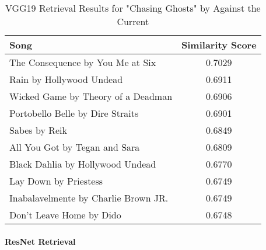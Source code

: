 \documentclass[sigconf]{acmart}
\begin{document}
\begin{table}[ht]
    \centering
    \caption{VGG19 Retrieval Results for "Chasing Ghosts" by Against the Current}
    \label{tab:vgg19_chasing_ghosts}
    \begin{tabular}{lc}
        \toprule
        \textbf{Song}                        & \textbf{Similarity Score} \\
        \midrule
        The Consequence by You Me at Six       & 0.7029                      \\
        Rain by Hollywood Undead              & 0.6911                      \\
        Wicked Game by Theory of a Deadman      & 0.6906                      \\
        Portobello Belle by Dire Straits        & 0.6901                      \\
        Sabes by Reik                           & 0.6849                      \\
        All You Got by Tegan and Sara            & 0.6809                      \\
        Black Dahlia by Hollywood Undead         & 0.6770                      \\
        Lay Down by Priestess                    & 0.6749                      \\
        Inabalavelmente by Charlie Brown JR.      & 0.6749                      \\
        Don't Leave Home by Dido                  & 0.6748                      \\
        \bottomrule
    \end{tabular}
\end{table}

\paragraph{ResNet Retrieval}
\end{document}
